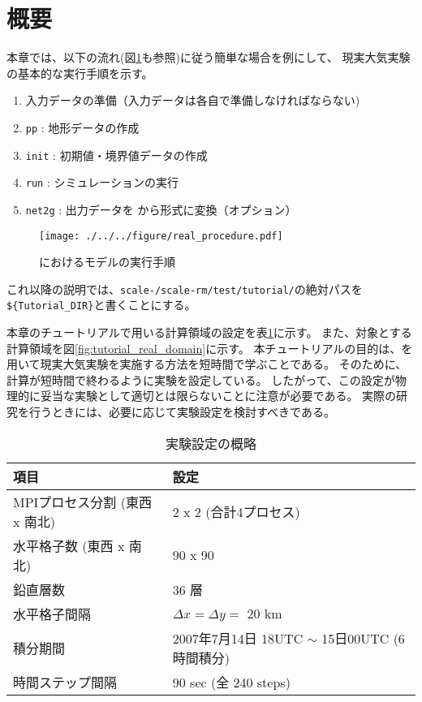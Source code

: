 \section{概要} \label{sec:tutorial_real_intro}
本章では、以下の流れ(図\ref{fig:howto}も参照)に従う簡単な場合を例にして、
現実大気実験の基本的な実行手順を示す。
\begin{enumerate}
\item  入力データの準備（入力データは各自で準備しなければならない)
\item  \texttt{pp}      : 地形データの作成
\item  \texttt{init}    : 初期値・境界値データの作成
\item  \texttt{run}     : シミュレーションの実行
\item  \texttt{net2g}   : 出力データを \netcdf から\grads 形式に変換（オプション）
\end{enumerate}

\begin{figure}[b]
\begin{center}
  \texttt{[image: ./../../figure/real\_procedure.pdf]}\\
  \caption{\scalerm におけるモデルの実行手順}
  \label{fig:howto}
\end{center}
\end{figure}

これ以降の説明では、\texttt{scale-{\version}/scale-rm/test/tutorial/}の絶対パスを
\verb|${Tutorial_DIR}|と書くことにする。

本章のチュートリアルで用いる計算領域の設定を表\ref{tab:grids}に示す。
また、対象とする計算領域を図\ref{fig:tutorial_real_domain}に示す。
本チュートリアルの目的は、\scalerm を用いて現実大気実験を実施する方法を短時間で学ぶことである。
そのために、計算が短時間で終わるように実験を設定している。
したがって、この設定が物理的に妥当な実験として適切とは限らないことに注意が必要である。
実際の研究を行うときには、必要に応じて実験設定を検討すべきである。

\begin{table}[h]
\begin{center}
  \caption{実験設定の概略}
  \label{tab:grids}
  \begin{tabularx}{150mm}{|l|X|} \hline
    \rowcolor[gray]{0.9} 項目 & 設定 \\ \hline
    MPIプロセス分割 (東西 x 南北) & 2 x 2 (合計4プロセス) \\ \hline
    水平格子数 (東西 x 南北) & 90 x 90 \\ \hline
    鉛直層数                 & 36 層                  \\ \hline
    水平格子間隔             & $\Delta x = \Delta y =$ 20 km       \\ \hline
    積分期間 & 2007年7月14日 18UTC $\sim$ 15日00UTC (6時間積分) \\ \hline
    時間ステップ間隔 & 90 sec (全 240 steps) \\ \hline
  \end{tabularx}
\end{center}
\end{table}

